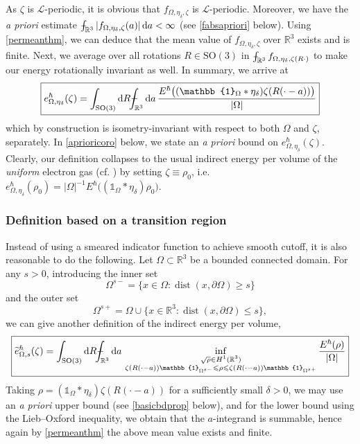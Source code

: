 \documentclass[final,onefignum,onetabnum,reqno]{amsart}
\theoremstyle{remark}
\renewcommand{\le}{\leqslant}
\renewcommand{\ge}{\geqslant}
\newcommand{\wt}[1]{\widetilde{#1}}
\DeclareMathOperator{\dist}{dist}
\newcommand{\RR}{\mathbb{R}}
\newcommand{\SO}{\mathrm{SO}}
\newcommand{\iden}{\mathbb{1}} %
\newcommand{\dd}{\mathrm{d}} %
\def\Xint#1{\mathchoice
{\XXint\displaystyle\textstyle{#1}}%
{\XXint\textstyle\scriptstyle{#1}}%
{\XXint\scriptstyle\scriptscriptstyle{#1}}%
{\XXint\scriptscriptstyle\scriptscriptstyle{#1}}%
\!\int}
\def\XXint#1#2#3{{\setbox0=\hbox{$#1{#2#3}{\int}$ }
\vcenter{\hbox{$#2#3$ }}\kern-.6\wd0}}
\def\dashint{\Xint-}
\newcommand{\LC}{\mathcal{L}}
\begin{document}
As $\zeta$ is $\LC$-periodic, it is obvious that $f_{\Omega,\eta_\delta,\zeta}$ is $\LC$-periodic. 
Moreover, we have the \emph{a priori} estimate $\dashint_{\RR^3} |f_{\Omega,\eta_\delta,\zeta}(a)|\,\dd a<\infty$ (see \cref{fabsapriori} below).
Using \cref{permeanthm}, we can deduce that the mean value of $f_{\Omega,\eta_\delta,\zeta}$ over $\RR^3$ exists and is finite.
Next, we average over all rotations $R\in\SO(3)$ in $\dashint_{\RR^3} f_{\Omega,\eta_\delta,\zeta(R\cdot)}$ to make our energy rotationally invariant as well. In summary, we arrive at
\begin{equation}\label{evoldef}
\boxed{e_{\Omega,\eta_\delta}^\hbar(\zeta)=\int_{\SO(3)}\dd  R \dashint_{\RR^3}\dd a\, \frac{E^\hbar\bigl((\iden_{\Omega}*\eta_\delta)\zeta(R(\cdot-a))\bigr)}{|\Omega|}}
\end{equation}
which by construction is isometry-invariant with respect to both $\Omega$ and $\zeta$, separately.
In \cref{aprioricoro} below, we state an \emph{a priori} bound on $e_{\Omega,\eta_\delta}^\hbar(\zeta)$.
Clearly, our definition collapses to the usual indirect energy per volume of the \emph{uniform} electron gas (cf. \cite{lewin2020local}) by setting $\zeta\equiv \rho_0$, i.e. 
$e_{\Omega,\eta_\delta}^\hbar(\rho_0)=|\Omega|^{-1}E^\hbar\bigl((\iden_{\Omega}*\eta_\delta)\rho_0\bigr)$.

\subsubsection{Definition based on a transition region}
Instead of using a smeared indicator function to achieve smooth cutoff, it is also reasonable to do the following. Let $\Omega\subset\RR^3$ be a bounded connected domain. For any $s>0$, introducing the inner set
$$
\Omega^{s-}=\{ x\in\Omega : \dist(x,\partial\Omega)\ge s \}
$$
and the outer set
$$
\Omega^{s+}=\Omega \cup \{x\in\RR^3 : \dist(x,\partial\Omega)\le s \},
$$
we can give another definition of the indirect energy per volume,
\begin{equation}\label{evoltrans}
\boxed{\wt{e}_{\Omega,s}^\hbar(\zeta)=\int_{\SO(3)}\dd  R \dashint_{\RR^3}\dd a\, \inf_{\substack{\sqrt{\rho}\in H^1(\RR^3)\\ \zeta(R(\cdot-a))\iden_{\Omega^{s-}}\le \rho \le \zeta(R(\cdot-a))\iden_{\Omega^{s+}} }} \frac{E^\hbar(\rho)}{|\Omega|}}
\end{equation}
Taking $\rho=(\iden_{\Omega}*\eta_\delta)\zeta(R(\cdot-a))$ for a sufficiently small $\delta>0$, we may use an \emph{a priori} upper bound (see \cref{basicbdprop} below), and for the lower bound using the Lieb--Oxford inequality, we obtain that the $a$-integrand is summable, hence again by \cref{permeanthm}
the above mean value exists and finite. 
\end{document}
